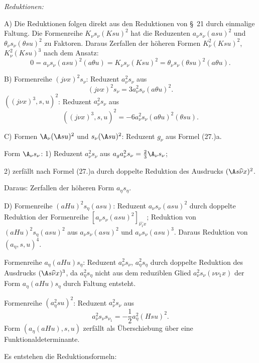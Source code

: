 \noindent\emph{Reduktionen:}

A) Die Reduktionen folgen direkt aus den Reduktionen von \S\ 21 durch einmalige Faltung. Die Formenreihe $K_\nu s_\nu(Ksu)^2$ hat die Reduzenten $a_\nu s_\nu(asu)^2$ und $\theta_\nu s_\nu(\theta su)^2$ zu Faktoren. Daraus Zerfallen der höheren Formen $K_\nu^2(Ksu)^2$, $K_\nu^2(Ksu)^3$ nach dem Ansatz:
\[
0=a_\nu s_\nu(asu)^2(a\theta u)=K_\nu s_\nu(Ksu)^2=\theta_\nu s_\nu(\theta su)^2(a\theta u).
\]

B) Formenreihe $(j\nu x)^2s_\nu$: Reduzent $a_\nu^2s_\nu$ aus
\[
(j\nu x)^2s_\nu=3a_\nu^2s_\nu(a\theta u)^2.
\]
$((j\nu x)^3,s,u)^2$: Reduzent $a_\nu^2s_\nu$ aus
\[
((j\nu x)^3,s,u)^2=-6a_\nu^2s_\nu(a\theta u)^2(\theta su).
\]

C) Formen $\A_\nu(\A su)^2$ und $s_\nu(\A su)^2$: Reduzent $g_\nu$ aus Formel (27.)a.

Form $\A_\nu s_\nu$: 1) Reduzent $a_\nu^2s_\nu$ aus $a_ga_\nu^2s_\nu=\frac23\A_\nu s_\nu$;

2) zerfällt nach Formel (27.)a durch doppelte Reduktion des Ausdrucks $(\A s\widehat{\nu}x)^2$.

Daraus: Zerfallen der höheren Form $a_\eta s_\eta$.

D) Formenreihe $(aHu)^2s_\eta(asu)$: Reduzent $a_\nu s_\nu(asu)^2$ durch doppelte Reduktion der Formenreihe $[a_\nu s_\nu(asu)^2]_{\widehat{\nu_1}x}$; Reduktion von $(aHu)^2s_\eta(asu)^2$ aus $a_\nu s_\nu(asu)^2$ und $a_\nu s_\nu(asu)^3$. Daraus Reduktion von $(a_\eta,s,u)^4$.

Formenreihe $a_\eta(aHu)s_\eta$: Reduzent $a_\nu^2s_\nu$, $a_\eta^2s_\eta$ durch doppelte Reduktion des Ausdrucks $(\A s\widehat{\nu}x)^3$, da $a_\eta^2s_\eta$ nicht aus dem reduziblen Glied $a_\nu^2s_\nu(\nu\nu_1x)$ der Form $a_\eta(aHu)s_\eta$ durch Faltung entsteht.

Formenreihe $(a_\eta^2su)^2$: Reduzent $a_\nu^2s_\nu$ aus
\[
a_\nu^2s_\nu s_{\nu_1}=-\frac12a_\eta^2(Hsu)^2.
\]
Form $(a_\eta(aHu),s,u)$ zerfällt als Überschiebung über eine Funktionaldeterminante.

Es entstehen die Reduktionsformeln:

